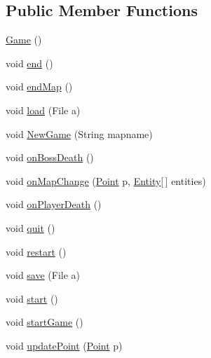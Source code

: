 \subsection*{Public Member Functions}
\begin{DoxyCompactItemize}
\item 
\hyperlink{classjdungeon_1_1frontend_1_1_game_a7d451f75a61b62d392cdea051851f29b}{Game} ()
\item 
void \hyperlink{classjdungeon_1_1frontend_1_1_game_a4abc1034085233bd14f1d159df7f3dc6}{end} ()
\item 
void \hyperlink{classjdungeon_1_1frontend_1_1_game_adc7387f710c783c36aec6bb796af2ce1}{endMap} ()
\item 
void \hyperlink{classjdungeon_1_1frontend_1_1_game_a36a352daddeb9a6823bb1e3565c94bd8}{load} (File a)
\item 
void \hyperlink{classjdungeon_1_1frontend_1_1_game_a995a4352abccfd549e5002f29c8746df}{NewGame} (String mapname)
\item 
void \hyperlink{classjdungeon_1_1frontend_1_1_game_a198317532f26dd32e7f47e9719c439fb}{onBossDeath} ()
\item 
void \hyperlink{classjdungeon_1_1frontend_1_1_game_abab9c631cc94a76bd86116e645df1ebb}{onMapChange} (\hyperlink{classjdungeon_1_1core_1_1world_1_1_point}{Point} p, \hyperlink{classjdungeon_1_1core_1_1world_1_1_entity}{Entity}\mbox{[}$\,$\mbox{]} entities)
\item 
void \hyperlink{classjdungeon_1_1frontend_1_1_game_a71336ffad47200e1653dfc258359103c}{onPlayerDeath} ()
\item 
void \hyperlink{classjdungeon_1_1frontend_1_1_game_a01846079c16bfc3770ef9da1706a7f88}{quit} ()
\item 
void \hyperlink{classjdungeon_1_1frontend_1_1_game_ad9023872333040ed40b4bb85e4ab41bd}{restart} ()
\item 
void \hyperlink{classjdungeon_1_1frontend_1_1_game_a4d3cc31a8345bd3c7a38c0df3bd8a380}{save} (File a)
\item 
void \hyperlink{classjdungeon_1_1frontend_1_1_game_a56d03000c771a364fbf4c080fb04764d}{start} ()
\item 
void \hyperlink{classjdungeon_1_1frontend_1_1_game_a9163c3e392b84832fae53080a32cc7a7}{startGame} ()
\item 
void \hyperlink{classjdungeon_1_1frontend_1_1_game_a6e33d7cb1ee618b6995d3fd1b25edcf3}{updatePoint} (\hyperlink{classjdungeon_1_1core_1_1world_1_1_point}{Point} p)
\end{DoxyCompactItemize}


